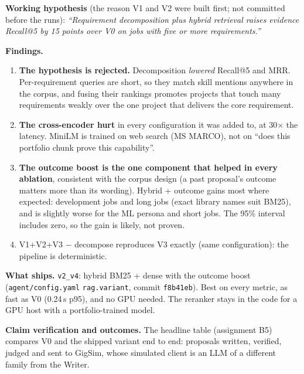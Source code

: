 \documentclass[10pt,a4paper]{article}
\newcommand{\code}[1]{\texttt{\small #1}}
\newcommand{\tbl}[3][]{\begin{table}[h!]\centering\caption{#2}#1\adjustbox{max width=\linewidth}{\small}\par\vspace{1pt}{\scriptsize}\end{table}}
\newcommand{\tblfit}[3][]{\tbl[#1]{#2}{#3}}
\begin{document}
\textbf{Working hypothesis} (the reason V1 and V2 were built first; not committed before the runs): \emph{``Requirement decomposition plus hybrid retrieval raises evidence Recall@5 by 15 points over V0 on jobs with five or more requirements.''}

\tbl{Retrieval variants and ablation (60 jobs). ``$a - b$'' = variant $a$ with component $b$ removed.}{rag}

\tblfit{Shipped variant vs V0 by job type, requirement count and persona.}{breakdown}

\textbf{Findings.}
\begin{enumerate}
\item \textbf{The hypothesis is rejected.} Decomposition \emph{lowered} Recall@5 and MRR. Per-requirement queries are short, so they match skill mentions anywhere in the corpus, and fusing their rankings promotes projects that touch many requirements weakly over the one project that delivers the core requirement.
\item \textbf{The cross-encoder hurt} in every configuration it was added to, at 30$\times$ the latency. MiniLM is trained on web search (MS MARCO), not on ``does this portfolio chunk prove this capability''.
\item \textbf{The outcome boost is the one component that helped in every ablation}, consistent with the corpus design (a past proposal's outcome matters more than its wording). Hybrid + outcome gains most where expected: development jobs and long jobs (exact library names suit BM25), and is slightly worse for the ML persona and short jobs. The 95\% interval includes zero, so the gain is likely, not proven.
\item V1+V2+V3 $-$ decompose reproduces V3 exactly (same configuration): the pipeline is deterministic.
\end{enumerate}

\textbf{What ships.} \code{v2\_v4}: hybrid BM25 + dense with the outcome boost (\code{agent/config.yaml} \code{rag.variant}, commit \code{f8b41eb}). Best on every metric, as fast as V0 (0.24\,s p95), and no GPU needed. The reranker stays in the code for a GPU host with a portfolio-trained model.

\textbf{Claim verification and outcomes.} The headline table (assignment B5) compares V0 and the shipped variant end to end: proposals written, verified, judged and sent to GigSim, whose simulated client is an LLM of a different family from the Writer.

\tbl[\label{tab:headline}]{Headline (assignment B5): V0 vs shipped, end to end.}{headline}
\end{document}
